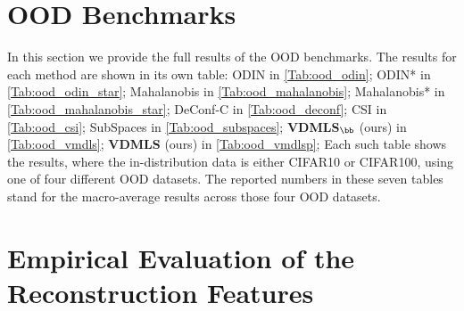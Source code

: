 \documentclass[accepted]{uai2022} %
\begin{document}
    
\section{OOD Benchmarks}
In this section we provide the full results of the OOD benchmarks.
The results for each method are shown in its own table:
ODIN in \autoref{Tab:ood_odin}; 
ODIN* in \autoref{Tab:ood_odin_star};
Mahalanobis in \autoref{Tab:ood_mahalanobis};
Mahalanobis* in \autoref{Tab:ood_mahalanobis_star};
DeConf-C in \autoref{Tab:ood_deconf};
CSI in \autoref{Tab:ood_csi};
SubSpaces in \autoref{Tab:ood_subspaces};
\textbf{VDMLS}$_\bb$ (ours) in \autoref{Tab:ood_vmdls};
\textbf{VDMLS} (ours) in \autoref{Tab:ood_vmdlsp};
Each such table shows the results, where the in-distribution data
is either CIFAR10 or CIFAR100, using one of four different OOD datasets.
The reported numbers in these seven tables stand for the macro-average results across those four OOD datasets.


\section{Empirical Evaluation of the Reconstruction Features}
\end{document}
